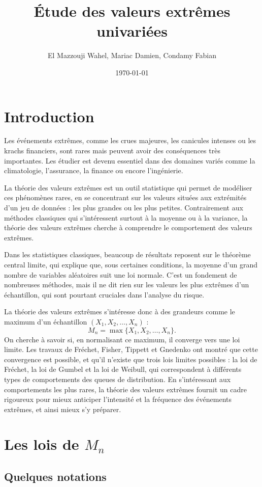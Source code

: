 \documentclass{article}
\title{Étude des valeurs extrêmes univariées}
\author{El Mazzouji Wahel, Mariac Damien, Condamy Fabian}
\date{\today}
\theoremstyle{plain}
\theoremstyle{definition}
\theoremstyle{plain}
\begin{document}
\maketitle 
\newpage
\tableofcontents 
\newpage
\section{Introduction}
Les événements extrêmes, comme les crues majeures, les canicules intenses ou les krachs financiers, sont rares mais peuvent avoir des conséquences très importantes. Les étudier est devenu essentiel dans des domaines variés comme la climatologie, l’assurance, la finance ou encore l’ingénierie.

La théorie des valeurs extrêmes est un outil statistique qui permet de modéliser ces phénomènes rares, en se concentrant sur les valeurs situées aux extrémités d’un jeu de données : les plus grandes ou les plus petites. Contrairement aux méthodes classiques qui s'intéressent surtout à la moyenne ou à la variance, la théorie des valeurs extrêmes cherche à comprendre le comportement des valeurs extrêmes.

Dans les statistiques classiques, beaucoup de résultats reposent sur le théorème central limite, qui explique que, sous certaines conditions, la moyenne d’un grand nombre de variables aléatoires suit une loi normale. C’est un fondement de nombreuses méthodes, mais il ne dit rien sur les valeurs les plus extrêmes d’un échantillon, qui sont pourtant cruciales dans l’analyse du risque.

La théorie des valeurs extrêmes s’intéresse donc à des grandeurs comme le maximum d’un échantillon $(X_1, X_2, \dots, X_n)$ :
\[
M_n = \max\{X_1, X_2, \dots, X_n\}.
\]
On cherche à savoir si, en normalisant ce maximum, il converge vers une loi limite. Les travaux de Fréchet, Fisher, Tippett et Gnedenko ont montré que cette convergence est possible, et qu’il n’existe que trois lois limites possibles : la loi de Fréchet, la loi de Gumbel et la loi de Weibull, qui correspondent à différents types de comportements des queues de distribution.
En s’intéressant aux comportements les plus rares, la théorie des valeurs extrêmes fournit un cadre rigoureux pour mieux anticiper l’intensité et la fréquence des événements extrêmes, et ainsi mieux s’y préparer.
\section{Les lois de $M_n$}

\subsection{Quelques notations }
\end{document}
